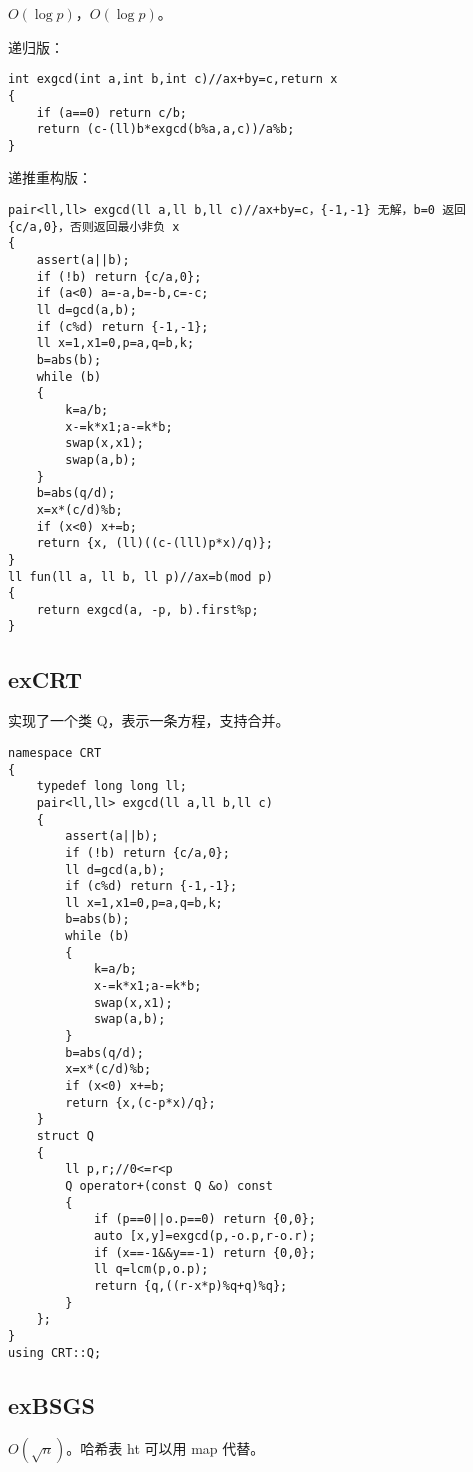 \documentclass[12pt]{ctexart}
\begin{document}
$O(\log p)$，$O(\log p)$。

递归版：

\begin{lstlisting}
int exgcd(int a,int b,int c)//ax+by=c,return x
{
	if (a==0) return c/b;
	return (c-(ll)b*exgcd(b%a,a,c))/a%b;
}
\end{lstlisting}

递推重构版：

\begin{lstlisting}
pair<ll,ll> exgcd(ll a,ll b,ll c)//ax+by=c，{-1,-1} 无解，b=0 返回 {c/a,0}，否则返回最小非负 x
{
	assert(a||b);
	if (!b) return {c/a,0};
	if (a<0) a=-a,b=-b,c=-c;
	ll d=gcd(a,b);
	if (c%d) return {-1,-1};
	ll x=1,x1=0,p=a,q=b,k;
	b=abs(b);
	while (b)
	{
		k=a/b;
		x-=k*x1;a-=k*b;
		swap(x,x1);
		swap(a,b);
	}
	b=abs(q/d);
	x=x*(c/d)%b;
	if (x<0) x+=b;
	return {x, (ll)((c-(lll)p*x)/q)};
}
ll fun(ll a, ll b, ll p)//ax=b(mod p)
{
	return exgcd(a, -p, b).first%p;
}
\end{lstlisting}

\subsection{exCRT}

实现了一个类 Q，表示一条方程，支持合并。

\begin{lstlisting}
namespace CRT
{
	typedef long long ll;
	pair<ll,ll> exgcd(ll a,ll b,ll c)
	{
		assert(a||b);
		if (!b) return {c/a,0};
		ll d=gcd(a,b);
		if (c%d) return {-1,-1};
		ll x=1,x1=0,p=a,q=b,k;
		b=abs(b);
		while (b)
		{
			k=a/b;
			x-=k*x1;a-=k*b;
			swap(x,x1);
			swap(a,b);
		}
		b=abs(q/d);
		x=x*(c/d)%b;
		if (x<0) x+=b;
		return {x,(c-p*x)/q};
	}
	struct Q
	{
		ll p,r;//0<=r<p
		Q operator+(const Q &o) const
		{
			if (p==0||o.p==0) return {0,0};
			auto [x,y]=exgcd(p,-o.p,r-o.r);
			if (x==-1&&y==-1) return {0,0};
			ll q=lcm(p,o.p);
			return {q,((r-x*p)%q+q)%q};
		}
	};
}
using CRT::Q;
\end{lstlisting}


\subsection{exBSGS}

$O(\sqrt n)$。哈希表 ht 可以用 map 代替。
\end{document}
